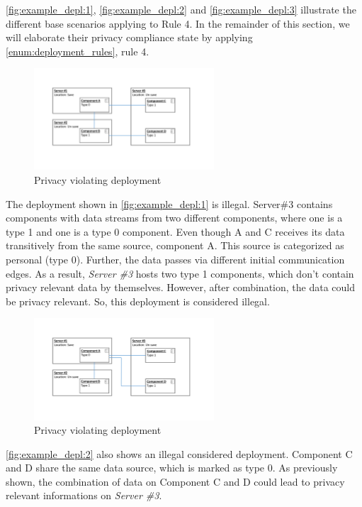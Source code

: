 \autoref{fig:example_depl:1}, \autoref{fig:example_depl:2} and \autoref{fig:example_depl:3} illustrate the different base scenarios applying to Rule 4. In the remainder of this section, we will elaborate their privacy compliance state by applying \autoref{enum:deployment_rules}, rule 4.

\begin{figure}[h]
	\centering
	\includegraphics[trim = 35mm 45mm 40mm 30mm, clip, width=0.6\textwidth]{graphs/deployment_example_1}
	\caption{Privacy violating deployment}
	\label{fig:example_depl:1}
\end{figure}

The deployment shown in \autoref{fig:example_depl:1} is illegal. Server\#3 contains components with data streams from two different components, where one is a type 1 and one is a type 0 component. Even though A and C receives its data transitively from the same source, component A. This source is categorized as personal (type 0). Further, the data passes via different initial communication edges. As a result, \textit{Server \#3} hosts two type 1 components, which don't contain privacy relevant data by themselves. However, after combination, the data could be privacy relevant. So, this deployment is considered illegal.

\begin{figure}[h]
	\centering
	\includegraphics[trim = 35mm 45mm 40mm 30mm, clip, width=0.6\textwidth]{graphs/deployment_example_2}
	\caption{Privacy violating deployment}
	\label{fig:example_depl:2}
\end{figure}

\autoref{fig:example_depl:2} also shows an illegal considered deployment. Component C and D share the same data source, which is marked as type 0. As previously shown, the combination of data on Component C and D could lead to privacy relevant informations on \textit{Server \#3}.

